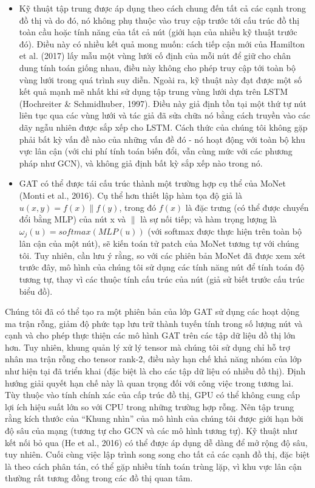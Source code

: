 \begin{itemize}
		\item Kỹ thuật tập trung được áp dụng theo cách chung đến tất cả các cạnh trong đồ thị và do đó, nó không phụ thuộc vào truy cập trước tới cấu trúc đồ thị toàn cầu hoặc tính năng của tất cả nút (giới hạn của nhiều kỹ thuật trước đó). Điều này có nhiều kết quả mong muốn: cách tiếp cận mới của Hamilton et al. (2017) lấy mẫu một vùng lưới cố định của mỗi nút để giữ cho chân dung tính toán giống nhau, điều này không cho phép truy cập tới toàn bộ vùng lưới trong quá trình suy diễn. Ngoài ra, kỹ thuật này đạt được một số kết quả mạnh mẽ nhất khi sử dụng tập trung vùng lưới dựa trên LSTM (Hochreiter \& Schmidhuber, 1997). Điều này giả định tồn tại một thứ tự nút liên tục qua các vùng lưới và tác giả đã sửa chữa nó bằng cách truyền vào các dãy ngẫu nhiên được sắp xếp cho LSTM. Cách thức của chúng tôi không gặp phải bất kỳ vấn đề nào của những vấn đề đó - nó hoạt động với toàn bộ khu vực lân cận (với chi phí tính toán biến đổi, vẫn cùng mức với các phương pháp như GCN), và không giả định bất kỳ sắp xếp nào trong nó.
		
		\item GAT có thể được tái cấu trúc thành một trường hợp cụ thể của MoNet (Monti et al., 2016). Cụ thể hơn thiết lập hàm tọa độ giả là $u(x,y) = f(x)\|f(y)$, trong đó $f(x)$ là đặc trưng (có thể được chuyển đổi bằng MLP) của nút x và $\|$ là sự nối tiếp; và hàm trọng lượng là 
		\(\omega_j(u) = softmax(MLP(u))\) 
		(với softmax được thực hiện trên toàn bộ lân cận của một nút), sẽ kiến toán tử patch của MoNet tương tự với chúng tôi. Tuy nhiên, cần lưu ý rằng, so với các phiên bản MoNet đã được xem xét trước đây, mô hình của chúng tôi sử dụng các tính năng nút để tính toán độ tương tự, thay vì các thuộc tính cấu trúc của nút (giả sử biết trước cấu trúc biểu đồ).
		
	\end{itemize}

Chúng tôi đã có thể tạo ra một phiên bản của lớp GAT sử dụng các hoạt dộng ma trận rỗng, giảm độ phức tạp lưu trữ thành tuyến tính trong số lượng nút và cạnh và cho phép thực thiện các mô hình GAT trên các tập dữ liệu đồ thị lớn hơn. Tuy nhiên, khung quản lý xử lý tensor mà chúng tôi sử dụng chỉ hỗ trợ nhân ma trận rỗng cho tensor rank-2, điều này hạn chế khả năng nhóm của lớp như hiện tại đã triển khai (đặc biệt là cho các tập dữ liệu có nhiều đồ thị). Định hướng giải quyết hạn chế này là quan trọng đối với công việc trong tương lai. Tùy thuộc vào tính chính xác của cấp trúc đồ thị, GPU có thể không cung cấp lợi ích hiệu suất lớn so với CPU trong những trường hợp rỗng. Nên tập trung rằng kích thước của “Khung nhìn” của mô hình của chúng tôi được giới hạn bởi độ sâu của mạng (tương tự cho GCN và các mô hình tương tự). Kỹ thuật như kết nối bỏ qua (He et al., 2016) có thể được áp dụng dễ dàng để mở rộng độ sâu, tuy nhiên. Cuối cùng việc lập trình song song cho tất cả các cạnh đồ thị, đặc biệt là theo cách phân tán, có thể gặp nhiều tính toán trùng lặp, vì khu vực lân cận thường rất tương đồng trong các đồ thị quan tâm.












